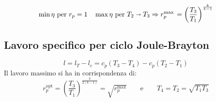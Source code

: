 \begin{align*}
    \min \eta ~\text{per}~ r_p = 1 \quad \max \eta ~\text{per}~ T_2 \shortrightarrow T_3 \Rightarrow r_{p}^{\max{}} = \left(\frac{T_3}{T_1}\right)^\frac{k}{k-1}
\end{align*}

\subsection{Lavoro specifico per ciclo Joule-Brayton}
\[
    l = l_T - l_c = c_p (T_3 - T_4) - c_p (T_2 - T_1)
\]
Il lavoro massimo si ha in corrispondenza di:
\[
    r_p^{\text{opt}} = \left(\frac{T_3}{T_1}\right)^\frac{k}{2(k-1)} = \sqrt{r_p^{\max{}}} \qquad\text{e}\qquad T_4 = T_2 = \sqrt{T_1T_3}
\]
